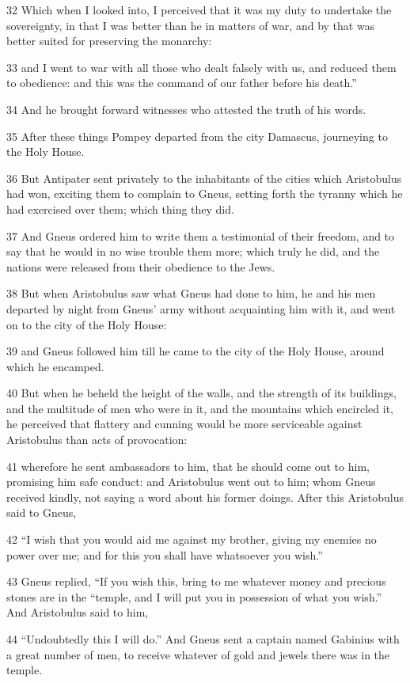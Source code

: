 32 Which when I looked into, I perceived that it was my duty to undertake the sovereignty, in that I was better than he in matters of war, and by that was better suited for preserving the monarchy: 

33 and I went to war with all those who dealt falsely with us, and reduced them to obedience: and this was the command of our father before his death.” 

34 And he brought forward witnesses who attested the truth of his words. 

35 After these things Pompey departed from the city Damascus, journeying to the Holy House. 

36 But Antipater sent privately to the inhabitants of the cities which Aristobulus had won, exciting them to complain to Gneus, setting forth the tyranny which he had exercised over them; which thing they did. 

37 And Gneus ordered him to write them a testimonial of their freedom, and to say that he would in no wise trouble them more; which truly he did, and the nations were released from their obedience to the Jews. 

38 But when Aristobulus saw what Gneus had done to him, he and his men departed by night from Gneus’ army without acquainting him with it, and went on to the city of the Holy House: 

39 and Gneus followed him till he came to the city of the Holy House, around which he encamped. 

40 But when he beheld the height of the walls, and the strength of its buildings, and the multitude of men who were in it, and the mountains which encircled it, he perceived that flattery and cunning would be more serviceable against Aristobulus than acts of provocation: 

41 wherefore he sent ambassadors to him, that he should come out to him, promising him safe conduct: and Aristobulus went out to him; whom Gneus received kindly, not saying a word about his former doings. After this Aristobulus said to Gneus, 

42 “I wish that you would aid me against my brother, giving my enemies no power over me; and for this you shall have whatsoever you wish.” 

43 Gneus replied, “If you wish this, bring to me whatever money and precious stones are in the “temple, and I will put you in possession of what you wish.” And Aristobulus said to him, 

44 “Undoubtedly this I will do.” And Gneus sent a captain named Gabinius with a great number of men, to receive whatever of gold and jewels there was in the temple. 

